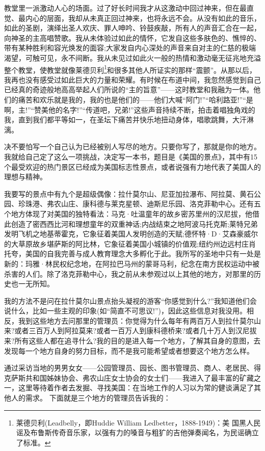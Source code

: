 教堂里一派激动人心的场面。过了好长时间我才从这激动中回过神来，但在最直觉、最内心的层面，我却从未真正回过神来，也将永远不会。从没有如此的音乐，如此的圣剧，演绎出圣人欢庆、罪人呻吟、铃鼓疾敲，所有人的声音汇合在一起，向神圣的主高唱赞歌。我从未体验过如此的情怀，它发自这些多肤色的、憔悴的、带有某种胜利和容光焕发的面容;大家发自内心深处的声音来自对主的仁慈的极端渴望，可触可见，永不间断。我从未见过如此火一般的热情和激动毫无征兆地充溢整个教堂，使教堂就像莱德贝利\footnote{莱德贝利(Leadbelly，即Huddie William Ledbetter，1888-1949)：美
国黑人民谣及布鲁斯传奇音乐家，以强有力的嗓音与粗犷的吉他弹奏闻名，为民谣确立了标准。}和很多其他人所证实的那样“震颤”。从那以后，我再也没有感受过如此巨大的力量和荣耀。有时候在布道中间，我忽然感觉到自己已经真的奇迹般地高高举起人们所说的“主的旨意”——这时教堂和我融为一体。他们的痛苦和欢乐就是我的，我的也是他们的——他们大喊“阿门!”“哈利路亚!”“是啊，主!”“赞美他的名字!”“传道吧，兄弟!”这些声音持续不断，拍击着唱独角戏的我，直到我们都平等如一，在圣坛下痛苦并快乐地扭动身体，唱歌跳舞，大汗淋漓。

决不要怕写一个自己认为已经被别人写尽的地方。只要你写了，那就是你的地方。我就给自己定了这么一项挑战，决定写一本书，题目是《美国的景点》，其中有15个最受欢迎的热门景区已经成为美国标志性景点，或者说强有力地代表了美国人的理想与精神。

我要写的景点中有九个是超级偶像：拉什莫尔山、尼亚加拉瀑布、阿拉莫、黄石公园、珍珠港、弗农山庄、康科德与莱克星顿、迪斯尼乐园、洛克菲勒中心。还有五个地方体现了对美国的独特看法：马克·吐温童年的故乡密苏里州的汉尼拔，他借此创造了密西西比河和理想童年的双重神话;内战结束之地阿波马托克斯;莱特兄弟发明飞机之地基蒂霍克，它象征着美国人发明创造的天赋;德怀特·D·艾森豪威尔的大草原故乡堪萨斯的阿比林，它象征着美国小城镇的价值观;纽约州边远村庄肖托夸，美国的自我完善与成人教育理念大多孵化于此。我所写的圣地中只有一处是新的：玛雅·林民权纪念地，在阿拉巴马州的蒙哥马利，纪念在南方民权运动中被杀害的人们。除了洛克菲勒中心，我之前从未参观过以上其他的地方，对那里的历史也一无所知。

我的方法不是问在拉什莫尔山景点抬头凝视的游客“你感觉到什么?”我知道他们会说什么，比如一些主观的印象(如“简直不可思议!”)，因此这些信息对我没用。相反，我到这些地方去问那里的管理员：你觉得为什么每年有两百万人到拉什莫尔山来?或者三百万人到阿拉莫来?或者一百万人到康科德桥来?或者几十万人到汉尼拔来?所有这些人都在追寻什么?我的目的是进入每一个地方，了解其自身的意图，去发现每一个地方自身的努力目标，而不是我可能希望或者想要这个地方怎么样。


通过采访当地的男男女女——公园管理员、园长、图书管理员、商人、老居民、得克萨斯共和国姊妹协会、弗农山庄女士协会的女士们——我进入了最丰富的矿藏之一，这里等待着作者去发掘、寻找美国：在当地工作的人习以为常的健谈满足了其他人的需求。 下面就是三个地方的管理员告诉我的：

